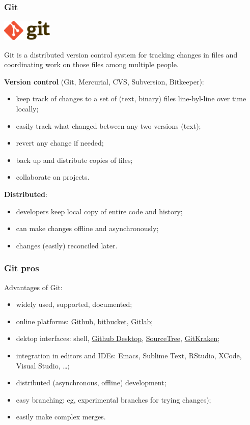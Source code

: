 \documentclass[10pt,svgnames,handout]{beamer}
\begin{document}
\begin{frame}
\frametitle{Git}
\includegraphics[height=1cm]{Git-logo}

Git is a distributed version control system for tracking changes in files and coordinating work on those files among multiple people.

\textbf{Version control} (Git, Mercurial, CVS, Subversion, Bitkeeper):
\begin{itemize}
   \item keep track of changes to a set of (text, binary) files line-byl-line over time locally;
   \item easily track what changed between any two versions (text);
   \item revert any change if needed;
   \item back up and distribute copies of files;
   \item collaborate on projects.
 \end{itemize} 

\textbf{Distributed}:
\begin{itemize}
  \item developers keep local copy of entire code and history;
  \item can make changes offline and asynchronously;
  \item changes (easily) reconciled later.
\end{itemize}
\end{frame}


\begin{frame}
\frametitle{Git pros}

Advantages of Git:
\begin{itemize}
  \item widely used, supported, documented;
  \item online platforms: \href{https://github.com/}{Github}, \href{https://bitbucket.org/}{bitbucket}, \href{https://about.gitlab.com/}{Gitlab};
  \item dektop interfaces: shell, \href{https://desktop.github.com/}{Github Desktop}, \href{https://www.sourcetreeapp.com/}{SourceTree}, \href{https://www.gitkraken.com/}{GitKraken};
  \item integration in editors and IDEs: Emacs, Sublime Text, RStudio, XCode, Visual Studio, \ldots;
  \item distributed (asynchronous, offline) development;
  \item easy branching: eg, experimental branches for trying changes);
  \item easily make complex merges.
\end{itemize}
\end{frame}
\end{document}
